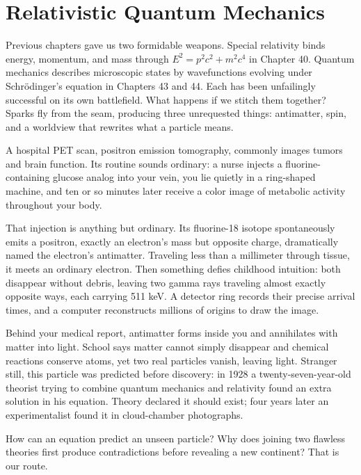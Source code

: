\chapter{Relativistic Quantum Mechanics}

Previous chapters gave us two formidable weapons. Special relativity binds energy, momentum, and mass through \(E^2=p^2c^2+m^2c^4\) in Chapter 40. Quantum mechanics describes microscopic states by wavefunctions evolving under Schrödinger's equation in Chapters 43 and 44. Each has been unfailingly successful on its own battlefield. What happens if we stitch them together? Sparks fly from the seam, producing three unrequested things: antimatter, spin, and a worldview that rewrites what a particle means.


A hospital PET scan, positron emission tomography, commonly images tumors and brain function. Its routine sounds ordinary: a nurse injects a fluorine-containing glucose analog into your vein, you lie quietly in a ring-shaped machine, and ten or so minutes later receive a color image of metabolic activity throughout your body.

That injection is anything but ordinary. Its fluorine-18 isotope spontaneously emits a positron, exactly an electron's mass but opposite charge, dramatically named the electron's antimatter. Traveling less than a millimeter through tissue, it meets an ordinary electron. Then something defies childhood intuition: both disappear without debris, leaving two gamma rays traveling almost exactly opposite ways, each carrying 511 keV. A detector ring records their precise arrival times, and a computer reconstructs millions of origins to draw the image.

Behind your medical report, antimatter forms inside you and annihilates with matter into light. School says matter cannot simply disappear and chemical reactions conserve atoms, yet two real particles vanish, leaving light. Stranger still, this particle was predicted before discovery: in 1928 a twenty-seven-year-old theorist trying to combine quantum mechanics and relativity found an extra solution in his equation. Theory declared it should exist; four years later an experimentalist found it in cloud-chamber photographs.

How can an equation predict an unseen particle? Why does joining two flawless theories first produce contradictions before revealing a new continent? That is our route.

